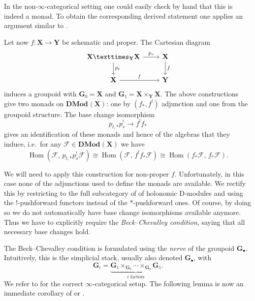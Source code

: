 \documentclass{oupau}
\theoremstyle{remark}
\let\stack\mathbf                           %
\newcommand\cat{\mathbf}                    %
\DeclareMathOperator\Hom{Hom}
\newcommand\cx\bullet                       %
\newcommand\sheaf\mathcal
\newcommand\catDMod[2][]{\cat{DMod}_{#1}(#2)}   %
\begin{document}
In the non-$∞$-categorical setting one could easily check by hand that this is indeed a monad.
To obtain the corresponding derived statement one applies an argument similar to \cite[Section~4.7.2]{GaitsgoryRozenblyum:2017:StudyInDAG:1}.

Let now $f\colon \stack X → \stack Y$ be schematic and proper.
The Cartesian diagram
\[
    \begin{tikzcd}
        \stack X ×_{\stack Y} \stack X \arrow[r, "p_s"] \arrow[d, "p_t"] & \stack X \arrow[d, "f"] \\
        \stack X \arrow[r, "f"] & \stack Y
    \end{tikzcd}
\]
induces a groupoid with $\stack{G}₀ = \stack X$ and $\stack{G}₁ = \stack X ×_{\stack Y} \stack X$.
The above constructions give two monads on $\catDMod{\stack{X}}$: one by $(f_*,f^!)$ adjunction and one from the groupoid structure.
The base change isomorphism
\[
    p_{t,*} p_s^! → f^! f_*
\]
gives an identification of these monads and hence of the algebras that they induce, i.e.~for any $\sheaf F ∈ \catDMod{\stack X}$ we have
\[
    \Hom(\sheaf F,\, p_{t,*} p_s^!\sheaf F) \cong
    \Hom(\sheaf F,\, f^! f_* \sheaf F) \cong
    \Hom(f_*\sheaf F,\, f_* \sheaf F).
\]

We will need to apply this construction for non-proper $f$.
Unfortunately, in this case none of the adjunctions used to define the monads are available.
We rectify this by restricting to the full subcategory of of holonomic D-modules and using the $!$-pushforward functors instead of the $*$-pushforward ones.
Of course, by doing so we do not automatically have base change isomorphisms available anymore.
Thus we have to explicitly require the \emph{Beck--Chevalley condition}, saying that all necessary base changes hold.

The Beck--Chevalley condition is formulated using the \emph{nerve} of the groupoid $\stack G_\cx$.
Intuitively, this is the simplicial stack, usually also denoted $\stack{G}_\cx$, with
\[
    \stack G_i = \underbrace{\stack G₁ ×_{\stack G₀} \dotsb ×_{\stack G₀} \stack G₁}_{\text{$i$ factors}}.
\]
We refer to \cite[Section~6.1.2]{Lurie:2009:HigherToposTheory} for the correct $∞$-categorical setup.
The following lemma is now an immediate corollary of \cite[Lemma~4.7.1.4]{GaitsgoryRozenblyum:2017:StudyInDAG:2} or \cite[Theorem~4.7.5.2]{Lurie:2017-draft:HigherAlgebra}.
\end{document}
